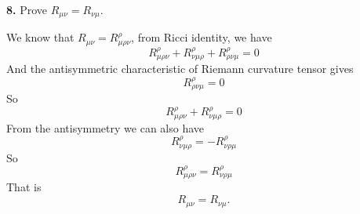 \documentclass{article}
\begin{document}
{\bf8.}\quad
Prove $R_{\mu\nu}=R_{\nu\mu}$.

We know that $R_{\mu\nu}=R_{\mu\rho\nu}^{\rho}$, from Ricci identity, we have
$$R_{\mu\rho\nu}^{\rho}+R_{\nu\mu\rho}^{\rho}+R_{\rho\nu\mu}^{\rho}=0$$
And the antisymmetric characteristic of Riemann curvature tensor gives
$$R_{\rho\nu\mu}^{\rho}=0$$
So
$$R_{\mu\rho\nu}^{\rho}+R_{\nu\mu\rho}^{\rho}=0$$
From the antisymmetry we can also have
$$R_{\nu\mu\rho}^{\rho}=-R_{\nu\rho\mu}^{\rho}$$
So
$$R_{\mu\rho\nu}^{\rho}=R_{\nu\rho\mu}^{\rho}$$
That is
$$R_{\mu\nu}=R_{\nu\mu}.$$
\end{document}
